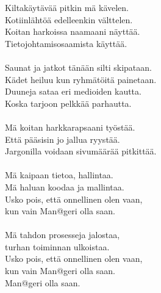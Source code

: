 
            Kiltakäytävää pitkin mä kävelen. \\
            Kotiinlähtöä edelleenkin välttelen. \\
            Koitan harkoissa naamaani näyttää. \\
            Tietojohtamisosaamista käyttää. \\
\hspace{10mm} \\
            Saunat ja jatkot tänään silti skipataan. \\
            Kädet heiluu kun ryhmätöitä painetaan. \\
            Duuneja sataa eri medioiden kautta. \\
            Koska tarjoon pelkkää parhautta. \\
\hspace{10mm} \\
            Mä koitan harkkarapsaani työstää. \\
            Että pääsisin jo jallua ryystää. \\
            Jargonilla voidaan sivumäärää pitkittää. \\
\hspace{10mm} \\
            Mä kaipaan tietoa, hallintaa. \\
            Mä haluan koodaa ja mallintaa. \\
            Usko pois, että onnellinen olen vaan, \\
            kun vain Man@geri olla saan. \\
\hspace{10mm} \\
            Mä tahdon prosesseja jalostaa, \\
            turhan toiminnan ulkoistaa. \\
            Usko pois, että onnellinen olen vaan, \\
            kun vain Man@geri olla saan. \\
            Man@geri olla saan. \\
